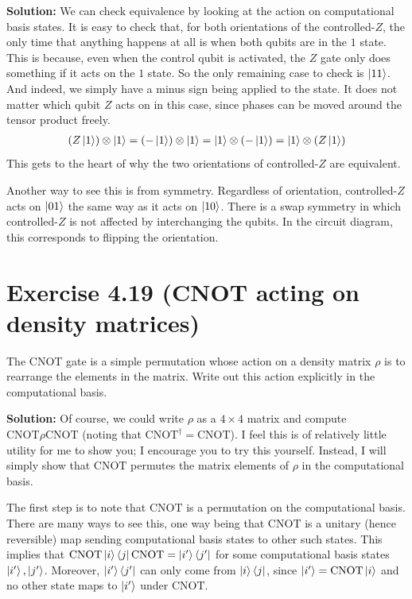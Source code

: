 \documentclass{book}
\begin{document}
    \textbf{Solution:} We can check equivalence by looking at the action on computational basis states. It is easy to check that, for both orientations of the controlled-$Z$, the only time that anything happens at all is when both qubits are in the $1$ state. This is because, even when the control qubit is activated, the $Z$ gate only does something if it acts on the $1$ state. So the only remaining case to check is $\ket{11}$. And indeed, we simply have a minus sign being applied to the state. It does not matter which qubit $Z$ acts on in this case, since phases can be moved around the tensor product freely.
    \begin{align}
        (Z\ket{1}) \otimes \ket{1} = (-\ket{1}) \otimes \ket{1} = \ket{1} \otimes (-\ket{1}) = \ket{1} \otimes (Z\ket{1})
    \end{align}
    This gets to the heart of why the two orientations of controlled-$Z$ are equivalent. 

    Another way to see this is from symmetry. Regardless of orientation, controlled-$Z$ acts on $\ket{01}$ the same way as it acts on $\ket{10}$. There is a swap symmetry in which controlled-$Z$ is not affected by interchanging the qubits. In the circuit diagram, this corresponds to flipping the orientation.

\section*{Exercise 4.19 (CNOT acting on density matrices)}
    The $\mathrm{CNOT}$ gate is a simple permutation whose action on a density matrix $\rho$ is to rearrange the elements in the matrix. Write out this action explicitly in the computational basis. 

    \textbf{Solution:} Of course, we could write $\rho$ as a $4 \times 4$ matrix and compute $\mathrm{CNOT} \rho \mathrm{CNOT}$ (noting that $\mathrm{CNOT}^\dagger = \mathrm{CNOT}$). I feel this is of relatively little utility for me to show you; I encourage you to try this yourself. Instead, I will simply show that $\mathrm{CNOT}$ permutes the matrix elements of $\rho$ in the computational basis. 

    The first step is to note that $\mathrm{CNOT}$ is a permutation on the computational basis. There are many ways to see this, one way being that $\mathrm{CNOT}$ is a unitary (hence reversible) map sending computational basis states to other such states. This implies that $\mathrm{CNOT}\ket{i}\bra{j}\mathrm{CNOT} = \ket{i'}\bra{j'}$ for some computational basis states $\ket{i'}, \ket{j'}$. Moreover, $\ket{i'}\bra{j'}$ can only come from $\ket{i}\bra{j}$, since $\ket{i'} = \mathrm{CNOT} \ket{i}$ and no other state maps to $\ket{i'}$ under $\mathrm{CNOT}$.
\end{document}
